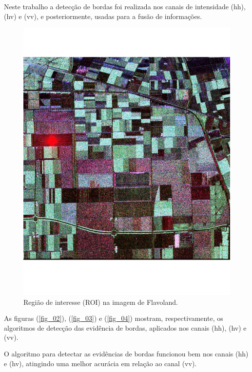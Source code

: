 \documentclass[conference]{IEEEtran}
\begin{document}
Neste trabalho a detecção de bordas foi realizada nos canais de intensidade (hh), (hv) e (vv), e posteriormente, usadas para a fusão de informações.   
\begin{figure}[hbt]
\centering
	\includegraphics[scale=0.3]{flevoland_radial_4_look.pdf}
			\vspace{-1.0cm}
	\caption{Região de interesse (ROI) na imagem de Flavoland.}
\label{fig_01}
\end{figure}

As figuras (\ref{fig_02}), (\ref{fig_03}) e (\ref{fig_04}) mostram, respectivamente, os algoritmos de detecção das evidência de bordas, aplicados nos canais (hh), (hv) e (vv). 

O algoritmo para detectar as evidências de bordas funcionou bem nos canais (hh) e (hv), atingindo uma melhor acurácia em relação ao canal (vv).  
\end{document}
